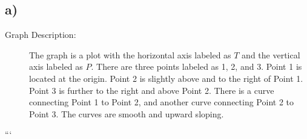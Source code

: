 

\subsection*{a)}

\begin{description}
    \item[Graph Description:] The graph is a plot with the horizontal axis labeled as \( T \) and the vertical axis labeled as \( P \). There are three points labeled as 1, 2, and 3. Point 1 is located at the origin. Point 2 is slightly above and to the right of Point 1. Point 3 is further to the right and above Point 2. There is a curve connecting Point 1 to Point 2, and another curve connecting Point 2 to Point 3. The curves are smooth and upward sloping.
\end{description}

```